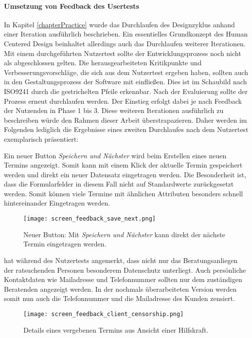 \paragraph{Umsetzung von Feedback des Usertests}
\label{paragraph:weitereIteration}

In Kapitel \ref{chapterPractice} wurde das Durchlaufen des Designzyklus anhand
einer Iteration ausführlich beschrieben. Ein essentielles Grundkonzept des
Human Centered Design beinhaltet allerdings auch das Durchlaufen weiterer
Iterationen. Mit einem durchgeführten Nutzertest sollte der Entwicklungsprozess
noch nicht als abgeschlossen gelten. Die herausgearbeiteten Kritikpunkte und
Verbesserungsvorschläge, die sich aus dem Nutzertest ergeben haben, sollten
auch in den Gestaltungsprozess der Software mit einfließen. Dies ist im
Schaubild nach ISO9241 durch die gestrichelten Pfeile erkennbar. Nach der
Evaluierung sollte der Prozess erneut durchlaufen werden. Der Einstieg erfolgt
dabei je nach Feedback der Nutzenden in Phase 1 bis 3\cite{iso9241}. Diese
weiteren Iterationen ausführlich zu beschreiben würde den Rahmen dieser Arbeit
überstrapazieren. Daher werden im Folgenden lediglich die Ergebnisse eines
zweiten Durchlaufes nach dem Nutzertest exemplarisch präsentiert:

Ein neuer Button \textit{Speichern und Nächster} wird beim Erstellen eines
neuen Termins angezeigt. Somit kann mit einem Klick der aktuelle Termin
gespeichert werden und direkt ein neuer Datensatz eingetragen werden. Die
Besonderheit ist, dass die Formularfelder in diesem Fall nicht auf
Standardwerte zurückgesetzt werden. Somit können viele Termine mit ähnlichen
Attributen besonders schnell hintereinander Eingetragen werden.

\begin{figure}[H]
    \caption{Neuer Button: Mit \textit{Speichern und Nächster} kann direkt der nächste Termin eingetragen werden.}
    \centering
    \texttt{[image: screen\_feedback\_save\_next.png]}
\end{figure}

\ipName hat während des Nutzertests angemerkt, dass nicht nur das Beratungsanliegen der ratsuchenden Personen besonderem Datenschutz unterliegt. Auch persönliche Kontaktdaten wie Mailadresse und Telefonnummer sollten nur dem zuständigen Beratenden angezeigt werden. In der nochmals überarbeiteten Version werden somit nun auch die Telefonnummer und die Mailadresse des Kunden zensiert.

\begin{figure}[H]
    \caption{Details eines vergebenen Termins aus Ansicht einer Hilfskraft.}
    \centering
    \texttt{[image: screen\_feedback\_client\_censorship.png]}
\end{figure}

